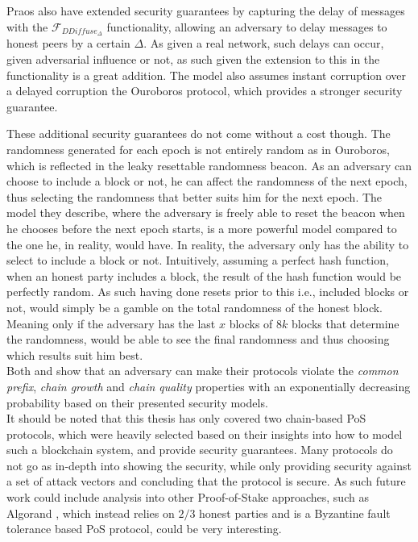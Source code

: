 Praos also have extended security guarantees by capturing the delay of messages with the $\mathcal{F}_{DDiffuse_{\Delta}}$ functionality, allowing an adversary to delay messages to honest peers by a certain $\Delta$. As given a real network, such delays can occur, given adversarial influence or not, as such given the extension to this in the functionality is a great addition. The model also assumes instant corruption over a delayed corruption the Ouroboros protocol, which provides a stronger security guarantee.


These additional security guarantees do not come without a cost though. The randomness generated for each epoch is not entirely random as in Ouroboros, which is reflected in the leaky resettable randomness beacon. As an adversary can choose to include a block or not, he can affect the randomness of the next epoch, thus selecting the randomness that better suits him for the next epoch. The model they describe, where the adversary is freely able to reset the beacon when he chooses before the next epoch starts, is a more powerful model compared to the one he, in reality, would have. In reality, the adversary only has the ability to select to include a block or not. Intuitively, assuming a perfect hash function, when an honest party includes a block, the result of the hash function would be perfectly random. As such having done resets prior to this i.e., included blocks or not, would simply be a gamble on the total randomness of the honest block. Meaning only if the adversary has the last $x$ blocks of $8k$ blocks that determine the randomness, would be able to see the final randomness and thus choosing which results suit him best.\\


Both \cite{ouroboros} and \cite{ouroboros-praos} show that an adversary can make their protocols violate the \emph{common prefix}, \emph{chain growth} and \emph{chain quality} properties with an exponentially decreasing probability based on their presented security models.\\


It should be noted that this thesis has only covered two chain-based PoS protocols, which were heavily selected based on their insights into how to model such a blockchain system, and provide security guarantees. Many protocols do not go as in-depth into showing the security, while only providing security against a set of attack vectors and concluding that the protocol is secure. As such future work could include analysis into other Proof-of-Stake approaches, such as Algorand \cite{algorand}, which instead relies on $2/3$ honest parties and is a Byzantine fault tolerance based PoS protocol, could be very interesting. 